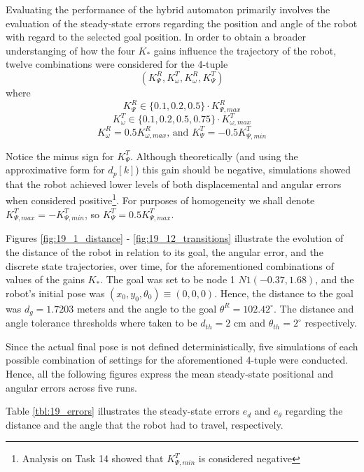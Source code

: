 Evaluating the performance of the hybrid automaton primarily involves the
evaluation of the steady-state errors regarding the position and angle of the
robot with regard to the selected goal position. In order to obtain a broader
understanging of how the four $K_{*}$ gains influence the trajectory of the
robot, twelve combinations were considered for the 4-tuple
$$(K_{\Psi}^R, K_{\omega}^T, K_{\omega}^R, K_{\Psi}^T)$$
where
$$K_{\Psi}^R \in \{0.1,0.2,0.5\} \cdot K_{\Psi,max}^R$$
$$K_{\omega}^T \in \{0.1,0.2,0.5,0.75\} \cdot K_{\omega,max}^T$$
$$K_{\omega}^R = 0.5 K_{\omega,max}^R \text{, and } K_{\Psi}^T = -0.5 K_{\Psi,min}^T$$

Notice the minus sign for $K_{\Psi}^T$. Although theoretically (and using the
approximative form for $d_p[k]$) this gain should be negative, simulations
showed that the robot achieved lower levels of both displacemental and angular
errors when considered positive\footnote{Analysis on Task 14 showed that
$K_{\Psi,min}^T$ is considered negative}. For purposes of homogeneity we shall
denote $K_{\Psi,max}^T = -K_{\Psi,min}^T$, so $K_{\Psi}^T = 0.5 K_{\Psi,max}^T$.

Figures \ref{fig:19_1_distance} - \ref{fig:19_12_transitions} illustrate the
evolution of the distance of the robot in relation to its goal, the angular
error, and the discrete state trajectories, over time, for the aforementioned
combinations of values of the gains $K_{*}$. The goal was set to be node 1
$N1(-0.37, 1.68)$, and the robot's initial pose was
$(x_0, y_0, \theta_0) \equiv (0,0,0)$. Hence, the distance to the goal was
$d_g = 1.7203$ meters and the angle to the goal $\theta^R = 102.42^{\circ}$. The
distance and angle tolerance thresholds where taken to be $d_{th} = 2\text{ cm}$
and $\theta_{th} = 2^{\circ}$ respectively.

Since the actual final pose is not defined deterministically, five simulations
of each possible combination of settings for the aforementioned 4-tuple were
conducted. Hence, all the following figures express the mean steady-state
positional and angular errors across five runs.

Table \ref{tbl:19_errors} illustrates the steady-state errors $e_d$ and
$e_{\theta}$ regarding the distance and the angle that the robot had to travel,
respectively.


